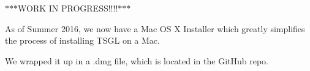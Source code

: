 $\ast$$\ast$$\ast$\-W\-O\-R\-K I\-N P\-R\-O\-G\-R\-E\-S\-S!!!!$\ast$$\ast$$\ast$

As of Summer 2016, we now have a Mac O\-S X Installer which greatly simplifies the process of installing T\-S\-G\-L on a Mac.

We wrapped it up in a .dmg file, which is located in the Git\-Hub repo. 